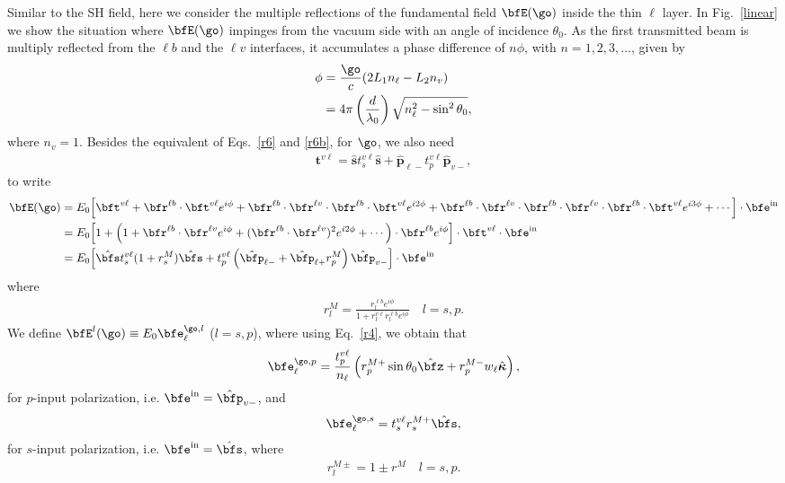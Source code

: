 Similar to the SH field, here we consider the multiple reflections of
the fundamental field $\bfE(\go)$ inside the thin $\ell$ layer.
In Fig.~\ref{linear} we show the situation where $\bfE(\go)$
impinges from the vacuum side with an angle of incidence $\theta_0$. 
As the first transmitted beam is multiply reflected from the $\ell b$ and the
$\ell v$ interfaces, it accumulates a phase difference of $n\phi$,
with $n=1,2,3,\ldots$, given by
\begin{align}\label{mphi}
\phi&=\frac{\go}{c}(2L_1n_\ell-L_2n_v)
\nonumber\\
&=4\pi\left(\frac{d}{\lambda_0}\right)\sqrt{n^2_\ell-\sin^2\theta_0}
,
\end{align}
where $n_v=1$. Besides the equivalent of Eqs.~\eqref{r6} and
\eqref{r6b}, for $\go$, we also need
\begin{align}\label{mvv}
\mathbf{t}^{v\ell}
= \hat{\mathbf{s}}t_s^{v\ell}\hat{\mathbf{s}} 
+ \hat{\mathbf{p}}_{\ell -}t_{p}^{v\ell} \hat{\mathbf{p}}_{v -}
,
\end{align}
to write
\begin{align}\label{mcvew}
\bfE(\go)
&=E_0\Big[
\bft^{v\ell}
+
\bfr^{\ell b}\cdot\bft^{v\ell}e^{i\phi}
+
\bfr^{\ell b}\cdot\bfr^{\ell v}\cdot \bfr^{\ell b}\cdot\bft^{v\ell} e^{i2\phi}
+
\bfr^{\ell b}\cdot\bfr^{\ell v}\cdot 
\bfr^{\ell b}\cdot\bfr^{\ell v}
\cdot \bfr^{\ell b}\cdot\bft^{v\ell} e^{i3\phi}
+\cdots\Big]\cdot\bfe^{\mathrm{in}}
\nonumber\\
&=E_0\Big[
1
+
\Big(1+
\bfr^{\ell b}\cdot\bfr^{\ell v}e^{i\phi}
+
(\bfr^{\ell b}\cdot\bfr^{\ell v})^2e^{i2\phi}+\cdots
\Big)\cdot
\bfr^{\ell b}e^{i\phi}
\Big]\cdot \bft^{v\ell}\cdot\bfe^{\mathrm{in}}
\nonumber\\
&=
E_0\Big[\hat\bfs t^{v\ell}_s(1+r^M_s)\hat\bfs
+
t^{v\ell}_p\left(\hat\bfp_{\ell-}+\hat\bfp_{\ell+}r^{M}_p
\right)\hat\bfp_{v-}
\Big]\cdot\bfe^{\mathrm{in}}
\end{align}
where
\begin{align}\label{mvrm}
r^M_l=\frac{r^{\ell b}_le^{i\phi}}{1+r^{v\ell}_lr^{\ell
  b}_le^{i\phi}}\quad l=s,p
.
\end{align}
We define $\bfE^l(\go)\equiv E_0\bfe^{\go,l}_\ell$ ($l=s,p$),
where using Eq.~\eqref{r4}, we obtain that
\begin{eqnarray}\label{mcvep}
\bfe^{\go,p}_\ell=\frac{t^{v\ell}_p}{n_\ell}\left( 
r^{M+}_p\sin\theta_0\hat\bfz  
+ 
r^{M-}_pw_\ell\hat{\boldsymbol{\kappa}}
\right)  
,
\end{eqnarray} 
for $p$-input polarization, i.e. $\bfe^{\mathrm{in}}=\hat\bfp_{v-}$, 
and
\begin{eqnarray}\label{mcvep}
\bfe^{\go,s}_\ell=t^{v\ell}_sr^{M+}_s\hat\bfs
,
\end{eqnarray}
for $s$-input polarization, i.e. $\bfe^{\mathrm{in}}=\hat\bfs$,
where
\begin{eqnarray}\label{mvc}
r^{M\pm}_l=1\pm r^M \quad l=s,p.
\end{eqnarray}
